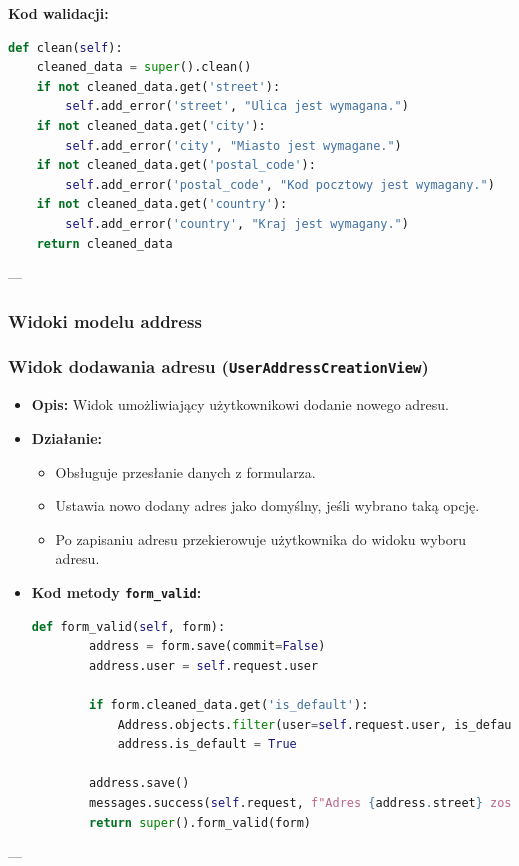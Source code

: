\documentclass[12pt,a4paper,oneside]{article}
\theoremstyle{definition}
\numberwithin{equation}{section}
\begin{document}
\textbf{Kod walidacji:}
\begin{lstlisting}[language=Python, caption=Walidacja formularza \texttt{UserAddressForm}]
def clean(self):
    cleaned_data = super().clean()
    if not cleaned_data.get('street'):
        self.add_error('street', "Ulica jest wymagana.")
    if not cleaned_data.get('city'):
        self.add_error('city', "Miasto jest wymagane.")
    if not cleaned_data.get('postal_code'):
        self.add_error('postal_code', "Kod pocztowy jest wymagany.")
    if not cleaned_data.get('country'):
        self.add_error('country', "Kraj jest wymagany.")
    return cleaned_data
\end{lstlisting}

---

\subsubsection{Widoki modelu address}

\subsubsection*{Widok dodawania adresu (\texttt{UserAddressCreationView})}
\begin{itemize}
    \item \textbf{Opis:} Widok umożliwiający użytkownikowi dodanie nowego adresu.
    \item \textbf{Działanie:}
        \begin{itemize}
            \item Obsługuje przesłanie danych z formularza.
            \item Ustawia nowo dodany adres jako domyślny, jeśli wybrano taką opcję.
            \item Po zapisaniu adresu przekierowuje użytkownika do widoku wyboru adresu.
        \end{itemize}
    \item \textbf{Kod metody \texttt{form\_valid}:}
    \begin{lstlisting}[language=Python, caption=Obsługa poprawnego formularza w \texttt{UserAddressCreationView}]
    def form_valid(self, form):
        address = form.save(commit=False)
        address.user = self.request.user
    
        if form.cleaned_data.get('is_default'):
            Address.objects.filter(user=self.request.user, is_default=True).update(is_default=False)
            address.is_default = True
    
        address.save()
        messages.success(self.request, f"Adres {address.street} zostal zapisany.")
        return super().form_valid(form)
    \end{lstlisting}
\end{itemize}
---
\end{document}
